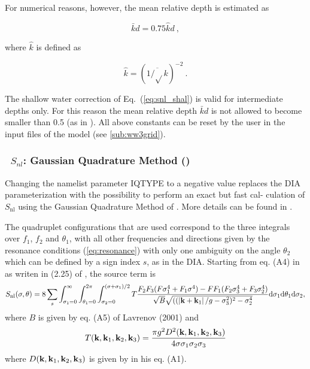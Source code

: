 \noindent
For numerical reasons, however, the mean relative depth is estimated as


\begin{equation}
\bar{k} d = 0.75 \hat{k} d \: , \label{eq:kd_num}
\end{equation}

\noindent
where $\hat{k}$ is defined as

\begin{equation}
\hat{k} = \left ( \overline{1/\sqrt{}k} \right )^{-2} \: .
\label{eq:k_hat}
\end{equation}

\noindent
The shallow water correction of Eq.~(\ref{eq:snl_shal}) is valid for
intermediate depths only. For this reason the mean relative depth
$\bar{k}d$ is not allowed to become smaller than 0.5 (as in \wam). All
above constants can be reset by the user in the input files of the
model (see \para\ref{sub:ww3grid}).

\vsssub
\subsubsection{~$S_{nl}$: Gaussian Quadrature Method  (\dia)} \label{sec:GQM}
\vsssub


\noindent
Changing the namelist parameter IQTYPE to a negative value replaces the
DIA parameterization with the possibility to perform an exact but fast cal-
culation of $S_{\mathrm{nl}}$ using the Gaussian Quadrature Method of \cite{Lavrenov2001}.
More details can be found in \cite{Gagnaire-Renou2009}.


The quadruplet configurations that are used correspond to the three integrals over $f_1$, $f_2$ and $\theta_1$, with all other frequencies and directions given by the resonance conditions (\ref{eq:resonance}) with only one ambiguity on the angle $\theta_2$ which can be defined by a sign index $s$, as in the DIA.  Starting from eq. (A4) in \cite{Lavrenov2001} as writen in (2.25) of \cite{Gagnaire-Renou2009}, the source term is 
\begin{equation}
S_{\mathrm{nl}}(\sigma,\theta) =  8 \sum_s \int_{\sigma_1=0}^\infty \int_{\theta_1=0}^{2 \pi} \int_{\sigma_2=0}^{(\sigma+\sigma_1)/2}  T  \frac{F_2 F_3 (F \sigma_1^4 + F_1 \sigma^4) - F F_1 (F_2 \sigma_3^4 + F_3 \sigma_2^4)}{\sqrt{B}\sqrt{((\left| \mbox{\bf k}+\mbox{\bf k}_1 \right|/g- \sigma_3^2)^2-\sigma_2^4} } {\mathrm d}\sigma_1 {\mathrm d}\theta_1 {\mathrm d}\sigma_2 ,
      \label{eq:snl_gqm}
\end{equation}
where $B$ is given by eq. (A5) of Lavrenov (2001) and  
\begin{equation}
T(\mbox{\bf k},\mbox{\bf k}_1,\mbox{\bf k}_2,\mbox{\bf k}_3) = \frac{\pi g^2 D^2(\mbox{\bf k},\mbox{\bf k}_1,\mbox{\bf k}_2,\mbox{\bf k}_3) }{4 \sigma \sigma_1 \sigma_2 \sigma_3}
\end{equation}
where $ D(\mbox{\bf k},\mbox{\bf k}_1,\mbox{\bf k}_2,\mbox{\bf k}_3)$ is given by \cite{Webb1978} in his eq. (A1). 

